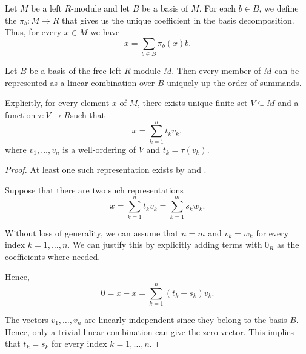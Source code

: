 \begin{definition}\label{def:module_basis_projection}
  Let \( M \) be a left \( R \)-module and let \( B \) be a basis of \( M \). For each \( b \in B \), we define the  \( \pi_b: M \to R \) that gives us the unique coefficient in the basis decomposition. Thus, for every \( x \in M \) we have
  \begin{equation*}
    x = \sum_{b \in B} \pi_b(x) b.
  \end{equation*}

  \begin{proposition}\label{thm:left_module_basis_decomposition}
    Let \( B \) be a \hyperref[def:module_linear_dependence]{basis} of the free left \( R \)-module \( M \). Then every member of \( M \) can be represented as a linear combination over \( B \) uniquely up the order of summands.

    Explicitly, for every element \( x \) of \( M \), there exists unique finite set \( V \subseteq M \) and a function \( \tau: V \to R \)such that
    \begin{equation*}
      x = \sum_{k=1}^n t_k v_k,
    \end{equation*}
    where \( v_1, \ldots, v_n \) is a well-ordering of \( V \) and \( t_k = \tau(v_k) \).
  \end{proposition}
  \begin{proof}
    At least one such representation exists by  and .

    Suppose that there are two such representations
    \begin{equation*}
      x = \sum_{k=1}^n t_k v_k = \sum_{k=1}^m s_k w_k.
    \end{equation*}

    Without loss of generality, we can assume that \( n = m \) and \( v_k = w_k \) for every index \( k = 1, \ldots, n \). We can justify this by explicitly adding terms with \( 0_R \) as the coefficients where needed.

    Hence,
    \begin{equation*}
      0 = x - x = \sum_{k=1}^n (t_k - s_k) v_k.
    \end{equation*}

    The vectors \( v_1, \ldots, v_n \) are linearly independent since they belong to the basis \( B \). Hence, only a trivial linear combination can give the zero vector. This implies that \( t_k = s_k \) for every index \( k = 1, \ldots, n \).


\end{proof}
\end{definition}
